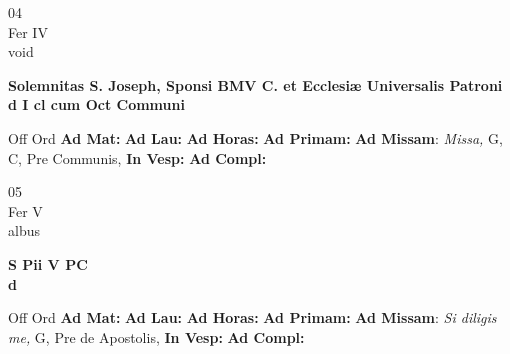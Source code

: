 \documentclass[10pt, openany]{book}
\begin{document}
    \begin{center}
        \begin{minipage}{3.5in}
            \vspace{2em}
            \begin{minipage}{0.5in}
                {\Huge 04} \\
                {\normalsize Fer IV} \\
                {\normalsize void}
            \end{minipage}
            \begin{minipage}{3.0in}
                \textbf{ \large Solemnitas S. Joseph, Sponsi BMV C. et Ecclesiæ Universalis Patroni \\
                \textnormal{\normalsize d I cl cum Oct Communi}} \\ 
            \end{minipage}
            \begin{justify}Off Ord
                \textbf{Ad Mat: }
                \textbf{Ad Lau: }
                \textbf{Ad Horas: }
                \textbf{Ad Primam: }\textbf{Ad Missam}: \textit{Missa,} G, C, Pre Communis,  
                \textbf{In Vesp: }
                \textbf{Ad Compl: }
            \end{justify}
        \end{minipage}
    \end{center}

    \begin{center}
        \begin{minipage}{3.5in}
            \vspace{2em}
            \begin{minipage}{0.5in}
                {\Huge 05} \\
                {\normalsize Fer V} \\
                {\normalsize albus}
            \end{minipage}
            \begin{minipage}{3.0in}
                \textbf{ \large S Pii V PC \\
                \textnormal{\normalsize d}} \\ 
            \end{minipage}
            \begin{justify}Off Ord
                \textbf{Ad Mat: }
                \textbf{Ad Lau: }
                \textbf{Ad Horas: }
                \textbf{Ad Primam: }\textbf{Ad Missam}: \textit{Si diligis me,} G, Pre de Apostolis,  
                \textbf{In Vesp: }
                \textbf{Ad Compl: }
            \end{justify}
        \end{minipage}
    \end{center}
\end{document}
